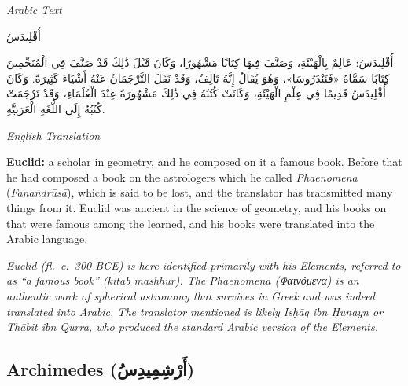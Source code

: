\documentclass[11pt,a4paper]{article}
\def\RL#1{\beginR#1\endR}
\newcommand{\cnote}[1]{\textcolor{notecolor}{\textit{#1}}}
\newcommand{\textarabic}[1]{{\arabicfont\RL{#1}}}
\newenvironment{arabiccol}{%
  \begin{minipage}[t]{0.48\textwidth}%
  \begin{tcolorbox}[colback=leftbg,colframe=rulecolor,boxrule=0.4pt,arc=2pt,left=5pt,right=5pt,top=5pt,bottom=5pt]%
  \centering\textit{\footnotesize Arabic Text}\\[0.4em]%
  \raggedright\arabicfont\small%
}{%
  \end{tcolorbox}%
  \end{minipage}%
}
\newenvironment{englishcol}{%
  \begin{minipage}[t]{0.48\textwidth}%
  \begin{tcolorbox}[colback=rightbg,colframe=rulecolor,boxrule=0.4pt,arc=2pt,left=5pt,right=5pt,top=5pt,bottom=5pt]%
  \centering\textit{\footnotesize English Translation}\\[0.4em]%
  \raggedright\small%
}{%
  \end{tcolorbox}%
  \end{minipage}%
}
\begin{document}
\noindent
\begin{arabiccol}
\beginR
أُقْلِيدَسُ

أُقْلِيدَسُ: عَالِمٌ بِالْهَيْئَةِ، وَصَنَّفَ فِيهَا كِتَابًا مَشْهُورًا، وَكَانَ قَبْلَ ذَٰلِكَ قَدْ صَنَّفَ فِي الْمُنَجِّمِينَ كِتَابًا سَمَّاهُ «فَنَنْدَرُوسَا»، وَهُوَ يُقَالُ إِنَّهُ تَالِفٌ، وَقَدْ نَقَلَ التَّرْجَمَانُ عَنْهُ أَشْيَاءَ كَثِيرَةً. وَكَانَ أُقْلِيدَسُ قَدِيمًا فِي عِلْمِ الْهَيْئَةِ، وَكَانَتْ كُتُبُهُ فِي ذَٰلِكَ مَشْهُورَةً عِنْدَ الْعُلَمَاءِ، وَقَدْ تَرْجَمَتْ كُتُبُهُ إِلَى اللُّغَةِ الْعَرَبِيَّةِ.
\endR
\end{arabiccol}
\hfill
\begin{englishcol}
\textbf{Euclid:} a scholar in geometry, and he composed on it a famous book. Before that he had composed a book on the astrologers which he called \textit{Phaenomena} (\textit{Fanandrūsā}), which is said to be lost, and the translator has transmitted many things from it. Euclid was ancient in the science of geometry, and his books on that were famous among the learned, and his books were translated into the Arabic language.

\cnote{Euclid (fl.~c.~300 BCE) is here identified primarily with his \textit{Elements}, referred to as ``a famous book'' (\textit{kitāb mashhūr}). The \textit{Phaenomena} (\textit{Φαινόμενα}) is an authentic work of spherical astronomy that survives in Greek and was indeed translated into Arabic. The translator mentioned is likely Isḥāq ibn Ḥunayn or Thābit ibn Qurra, who produced the standard Arabic version of the \textit{Elements}.}
\end{englishcol}

\par\vspace{0.5em}

\subsection{Archimedes (\textarabic{أَرْشِمِيدِسُ})}
\end{document}

